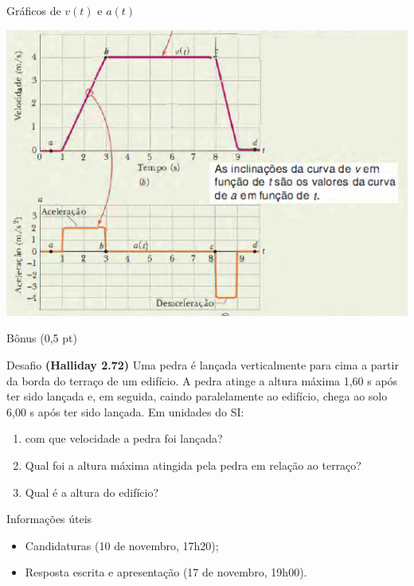 \documentclass[xcolor=dvipsnames,table]{beamer}
\begin{document}
	\begin{frame}{Gráficos de $v(t)$ e $a(t)$}
		\begin{center}
			\includegraphics[scale=0.6]{images/fig2-6bc}
		\end{center}
	\end{frame}
	
	\begin{frame}{Bônus (0,5 pt)}
		\begin{block}{Desafio}
			{\bf (Halliday 2.72)} Uma pedra é lançada verticalmente para cima a partir da borda do terraço de um edifício. A pedra atinge a altura máxima 1,60 s após ter sido lançada e, em seguida, caindo paralelamente ao edifício, chega ao solo 6,00 s após ter sido lançada. Em unidades do SI:
			\begin{enumerate}
				\item com que velocidade a pedra foi lançada? 
				\item Qual foi a altura máxima atingida pela pedra em relação ao terraço? 
				\item Qual é a altura do edifício?
			\end{enumerate}
		\end{block}
		\begin{block}{Informações úteis}
			\begin{itemize}
                \item Candidaturas (10 de novembro, 17h20);
                \item Resposta escrita e apresentação (17 de novembro, 19h00).
			\end{itemize}
		\end{block} 
	\end{frame}
	
	\begin{frame}
		\titlepage
	\end{frame}
	
\end{document}
